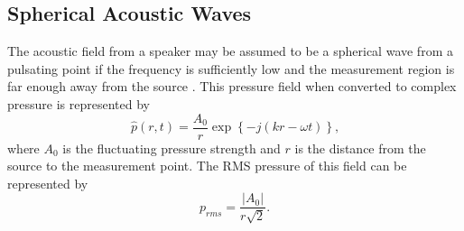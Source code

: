 \subsection{Spherical Acoustic Waves}
\label{sect:03_examples_spherical}
The acoustic field from a speaker may be assumed to be a spherical wave from a pulsating point if the frequency is sufficiently low and the measurement region is far enough away from the source \cite{Randall-1951-9NtPPXPq}.
This pressure field when converted to complex pressure is represented by
\begin{equation}
  \hat{p}(r,t) = \frac{A_0}{r}\exp\left\{-j(kr-\omega t)\right\} \textrm{,}
  \label{eqn:03_spherical_pressure}
\end{equation}
where $A_0$ is the fluctuating pressure strength and $r$ is the distance from the source to the measurement point.
The RMS pressure of this field can be represented by
\begin{equation}
  p_{rms} = \frac{|A_0|}{r\sqrt{2}} \textrm{.}
  \label{eqn:03_spherical_pressure_rms}
\end{equation}

